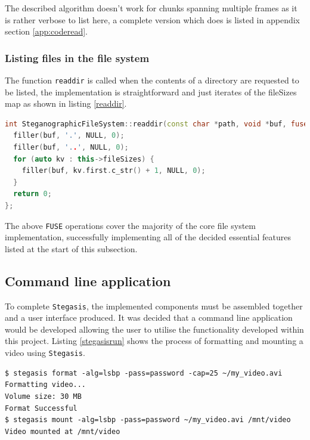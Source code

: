 \documentclass[paper=a4, fontsize=11pt,twoside]{scrartcl}
\numberwithin{table}{section}
\numberwithin{figure}{section}
\numberwithin{algorithm}{section}
\begin{document}
The described algorithm doesn't work for chunks spanning multiple frames as it is rather verbose to list here, a complete version which does is listed in appendix section \ref{app:coderead}.

\subsubsection{Listing files in the file system}

The function \texttt{readdir} is called when the contents of a directory are requested to be listed, the implementation is straightforward and just iterates of the fileSizes map as shown in listing \ref{readdir}.\\

\begin{lstlisting}[language=C++, caption={\texttt{FUSE} readdir implementation (\texttt{fs/stegfs.cc:264}).}, frame=single, label=readdir,upquote=true,float,floatplacement=!Hhbt]
int SteganographicFileSystem::readdir(const char *path, void *buf, fuse_fill_dir_t filler, off_t offset, struct fuse_file_info *fi) {
  filler(buf, '.', NULL, 0);
  filler(buf, '..', NULL, 0);
  for (auto kv : this->fileSizes) {
    filler(buf, kv.first.c_str() + 1, NULL, 0);
  }
  return 0;
};
\end{lstlisting}

\noindent
The above \texttt{FUSE} operations cover the majority of the core file system implementation, successfully implementing all of the decided essential features listed at the start of this subsection.

\subsection{Command line application}

To complete \texttt{Stegasis}, the implemented components must be assembled together and a user interface produced. It was decided that a command line application would be developed allowing the user to utilise the functionality developed within this project. Listing \ref{stegasisrun} shows the process of formatting and mounting a video using \texttt{Stegasis}.

\begin{lstlisting}[caption={Using \texttt{Stagasis} to format and mount a video.}, frame=single, label=stegasisrun]
$ stegasis format -alg=lsbp -pass=password -cap=25 ~/my_video.avi
Formatting video...
Volume size: 30 MB
Format Successful
$ stegasis mount -alg=lsbp -pass=password ~/my_video.avi /mnt/video
Video mounted at /mnt/video
\end{lstlisting}
\end{document}
